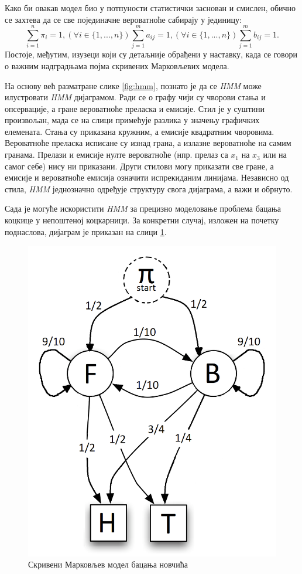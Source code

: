 \documentclass[12pt,oneside]{memoir}
\begin{document}
\begin{CJK}{UTF8}{ipxm}
Како би овакав модел био у потпуности статистички заснован и смислен, обично се захтева да се све појединачне вероватноће сабирају у јединицу: $$\sum_{i=1}^n \pi_i = 1, (\forall i \in \{1, ..., n\}) \sum_{j=1}^m a_{ij} = 1, (\forall i \in \{1, ..., n\}) \sum_{j=1}^m b_{ij} = 1.$$ Постоје, међутим, изузеци који су детаљније обрађени у наставку, када се говори о важним надградњама појма скривених Марковљевих модела.

На основу већ разматране слике \ref{fig:hmm}, познато је да се \textit{HMM} може илустровати \textit{HMM} дијаграмом. Ради се о графу чији су чворови стања и опсервације, а гране вероватноће преласка и емисије. Стил је у суштини произвољан, мада се на слици примећује разлика у значењу графичких елемената. Стања су приказана кружним, а емисије квадратним чворовима. Вероватноће преласка исписане су изнад грана, а излазне вероватноће на самим гранама. Прелази и емисије нулте вероватноће (нпр. прелаз са $x_1$ на $x_3$ или на самог себе) нису ни приказани. Други стилови могу приказати све гране, а емисије и вероватноће емисија означити испрекиданим линијама. Независно од стила, \textit{HMM} једнозначно одређује структуру свога дијаграма, а важи и обрнуто.

Сада је могуће искористити \textit{HMM} за прецизно моделовање проблема бацања коцкице у непоштеној коцкарници. За конкретни случај, изложен на почетку поднаслова, дијаграм је приказан на слици \ref{fig:kock}.

\begin{figure}[H]
  \centering
  \includegraphics[width=.5\textwidth]{kockarnica.png}
  \caption{Скривени Марковљев модел бацања новчића}
  \label{fig:kock}
\end{figure}


\end{CJK}
\end{document}
